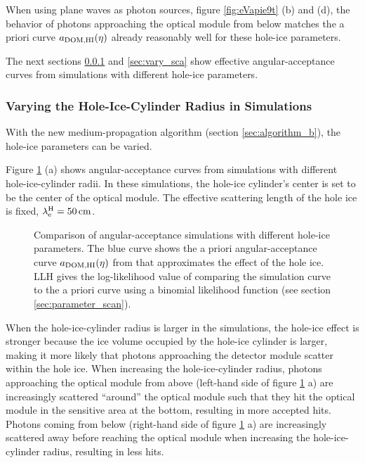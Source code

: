 When using plane waves as photon sources, figure \ref{fig:eVapie9t} (b)
and (d), the behavior of photons approaching the optical module from
below matches the a priori curve \(a_\text{DOM,HI}(\eta)\) \cite{icepaper}
already reasonably well for these hole-ice parameters.

The next sections \ref{sec:vary_radius} and \ref{sec:vary_sca} show
effective angular-acceptance curves from simulations with different
hole-ice parameters.

\subsubsection{Varying the Hole-Ice-Cylinder Radius in Simulations}
\label{sec:vary_radius}

With the new medium-propagation algorithm (section
\ref{sec:algorithm_b}), the hole-ice parameters can be varied.


Figure \ref{fig:neiyi3Al} (a) shows angular-acceptance curves from
simulations with different hole-ice-cylinder radii. In these
simulations, the hole-ice cylinder's center is set to be the center of
the optical module. The effective scattering length of the hole ice is
fixed, \(\lambda_\text{e}^\text{H} = 50\text{\,cm}\).

\begin{figure}[htbp]
  \hfill
  \hfill
  \caption{Comparison of angular-acceptance simulations with different hole-ice parameters. The blue curve shows the a priori angular-acceptance curve $a_\text{DOM,HI}(\eta)$ from \cite{icepaper} that approximates the effect of the hole ice. LLH gives the log-likelihood value of comparing the simulation curve to the a priori curve using a binomial likelihood function (see section \ref{sec:parameter_scan}).}
  \label{fig:neiyi3Al}
\end{figure}

When the hole-ice-cylinder radius is larger in the simulations, the
hole-ice effect is stronger because the ice volume occupied by the
hole-ice cylinder is larger, making it more likely that photons
approaching the detector module scatter within the hole ice. When
increasing the hole-ice-cylinder radius, photons approaching the optical
module from above (left-hand side of figure \ref{fig:neiyi3Al} a) are
increasingly scattered ``around'' the optical module such that they hit
the optical module in the sensitive area at the bottom, resulting in
more accepted hits. Photons coming from below (right-hand side of figure
\ref{fig:neiyi3Al} a) are increasingly scattered away before reaching
the optical module when increasing the hole-ice-cylinder radius,
resulting in less hits.

